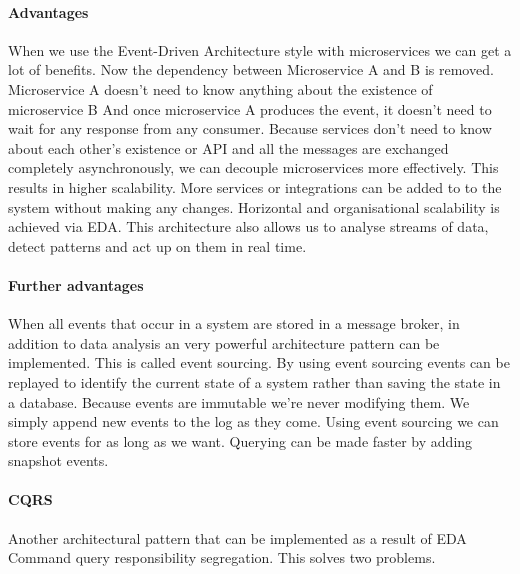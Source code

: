 \documentclass[a4paper, 11pt]{book}
\begin{document}
    \paragraph{Advantages}
    When we use the Event-Driven Architecture style with microservices we can get a lot of benefits.
    Now the dependency between Microservice A and B is removed.
    Microservice A doesn't need to know anything about the existence of microservice B
    And once microservice A produces the event, it doesn't need to wait for any response from any consumer.
    Because services don't need to know about each other's existence or API and all the messages are exchanged completely asynchronously, we can decouple microservices more effectively.
    This results in higher scalability.
    More services or integrations can be added to to the system without making any changes.
    Horizontal and organisational scalability is achieved via EDA.
    This architecture also allows us to analyse streams of data, detect patterns and act up on them in real time.

    \paragraph{Further advantages}
    When all events that occur in a system are stored in a message broker, in addition to data analysis an very powerful architecture pattern can be implemented.
    This is called event sourcing.
    By using event sourcing events can be replayed to identify the current state of a system rather than saving the state in a database.
    Because events are immutable we're never modifying them.
    We simply append new events to the log as they come.
    Using event sourcing we can store events for as long as we want.
    Querying can be made faster by adding snapshot events.

    \paragraph{CQRS}
    Another architectural pattern that can be implemented as a result of EDA
    Command query responsibility segregation.
    This solves two problems.
\end{document}
